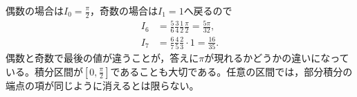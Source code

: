偶数の場合は$I_0=\frac{\pi}{2}$，奇数の場合は$I_1=1$へ戻るので
\begin{align*}
 I_6&=\frac56\frac34\frac12\frac{\pi}{2}
     =\frac{5\pi}{32},\\
 I_7&=\frac67\frac45\frac23\cdot1
     =\frac{16}{35}.
\end{align*}
偶数と奇数で最後の値が違うことが，答えに$\pi$が現れるかどうかの違いになっている。積分区間が$\left[0,\frac{\pi}{2}\right]$であることも大切である。任意の区間では，部分積分の端点の項が同じように消えるとは限らない。

%
%
